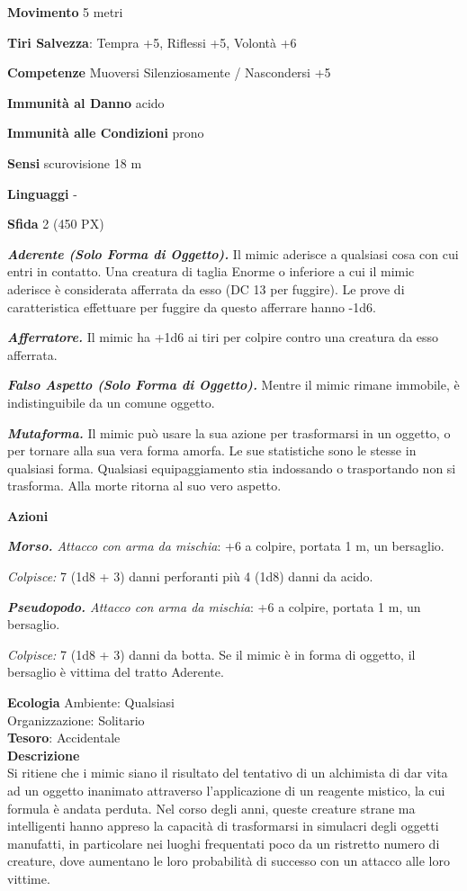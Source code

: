 \begin{multicols}{2}
	\textbf{Movimento} 5 metri

	\textbf{Tiri Salvezza}: Tempra +5, Riflessi +5, Volontà +6

	\textbf{Competenze} Muoversi Silenziosamente / Nascondersi +5

	\textbf{Immunità al Danno} acido

	\textbf{Immunità alle Condizioni} prono

	\textbf{Sensi} scurovisione 18 m

	\textbf{Linguaggi} -

	\textbf{Sfida} 2 (450 PX)

	\textit{\textbf{Aderente (Solo Forma di Oggetto).}} Il mimic aderisce a qualsiasi cosa con cui entri in contatto. Una creatura di taglia Enorme o inferiore a cui il mimic aderisce è considerata afferrata da esso (DC 13 per fuggire). Le prove di caratteristica effettuare per fuggire da
	questo afferrare hanno -1d6.

	\textit{\textbf{Afferratore.}} Il mimic ha +1d6 ai tiri per colpire contro una creatura da esso afferrata.

	\textit{\textbf{Falso Aspetto (Solo Forma di Oggetto).}} Mentre il mimic rimane immobile, è indistinguibile da un comune oggetto.

	\textit{\textbf{Mutaforma.}} Il mimic può usare la sua azione per trasformarsi in un oggetto, o per tornare alla sua vera forma amorfa. Le sue statistiche sono le stesse in qualsiasi forma. Qualsiasi equipaggiamento stia indossando o trasportando non si trasforma. Alla morte ritorna al suo vero aspetto.

	\textbf{Azioni}

	\textit{\textbf{Morso.} Attacco con arma da mischia}: +6 a colpire, portata 1 m, un bersaglio.

	\textit{Colpisce:} 7 (1d8 + 3) danni perforanti più 4 (1d8) danni da acido.

	\textit{\textbf{Pseudopodo.} Attacco con arma da mischia}: +6 a colpire, portata 1 m, un bersaglio.

	\textit{Colpisce:} 7 (1d8 + 3) danni da botta. Se il mimic è in forma di oggetto, il bersaglio è vittima del tratto Aderente.

	\textbf{Ecologia}
	Ambiente: Qualsiasi\\
	Organizzazione: Solitario\\
	\textbf{Tesoro}: Accidentale\\
	\textbf{Descrizione}\\
	Si ritiene che i mimic siano il risultato del tentativo di un alchimista di dar vita ad un oggetto inanimato attraverso l'applicazione di un reagente mistico, la cui formula è andata perduta. Nel corso degli anni, queste creature strane ma intelligenti hanno appreso la capacità di trasformarsi in simulacri degli oggetti manufatti, in particolare nei luoghi frequentati poco da un ristretto numero di creature, dove aumentano le loro probabilità di successo con un attacco alle loro vittime.


\end{multicols}
